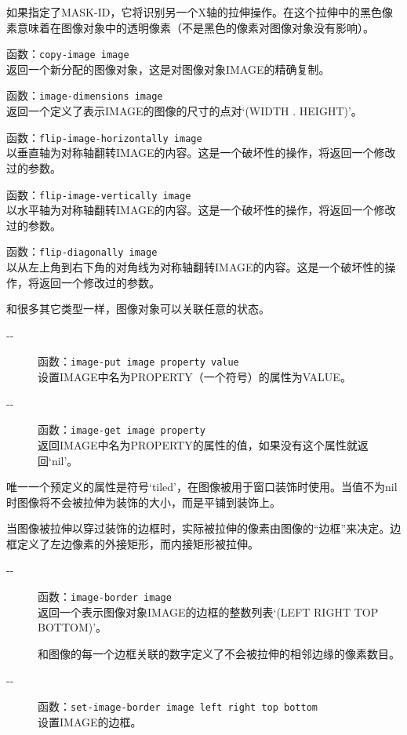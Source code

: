 \documentclass{book}
\begin{document}
\begin{CJK*}{UTF8}{gbsn}
\begin{description}
如果指定了MASK-ID，它将识别另一个X轴的拉伸操作。在这个拉伸中的黑色像素意味着在图像对象中的透明像素（不是黑色的像素对图像对象没有影响）。
\item[-{}-] 函数：\verb|copy-image image|\\
返回一个新分配的图像对象，这是对图像对象IMAGE的精确复制。
\item[-{}-] 函数：\verb|image-dimensions image|\\
返回一个定义了表示IMAGE的图像的尺寸的点对`(WIDTH . HEIGHT)'。
\item[-{}-] 函数：\verb|flip-image-horizontally image|\\
以垂直轴为对称轴翻转IMAGE的内容。这是一个破坏性的操作，将返回一个修改过的参数。
\item[-{}-] 函数：\verb|flip-image-vertically image|\\
以水平轴为对称轴翻转IMAGE的内容。这是一个破坏性的操作，将返回一个修改过的参数。
\item[-{}-] 函数：\verb|flip-diagonally image|\\
以从左上角到右下角的对角线为对称轴翻转IMAGE的内容。这是一个破坏性的操作，将返回一个修改过的参数。
\end{description}

和很多其它类型一样，图像对象可以关联任意的状态。
\begin{description}
\item[-{}-] 函数：\verb|image-put image property value|\\
设置IMAGE中名为PROPERTY（一个符号）的属性为VALUE。
\item[-{}-] 函数：\verb|image-get image property|\\
返回IMAGE中名为PROPERTY的属性的值，如果没有这个属性就返回`nil'。
\end{description}

唯一一个预定义的属性是符号`tiled'，在图像被用于窗口装饰时使用。当值不为nil时图像将不会被拉伸为装饰的大小，而是平铺到装饰上。

当图像被拉伸以穿过装饰的边框时，实际被拉伸的像素由图像的``边框''来决定。边框定义了左边像素的外接矩形，而内接矩形被拉伸。
\begin{description}
\item[-{}-] 函数：\verb|image-border image|\\
返回一个表示图像对象IMAGE的边框的整数列表`(LEFT RIGHT TOP BOTTOM)'。

和图像的每一个边框关联的数字定义了不会被拉伸的相邻边缘的像素数目。
\item[-{}-] 函数：\verb|set-image-border image left right top bottom|\\
设置IMAGE的边框。


\end{description}
\end{CJK*}
\end{document}
